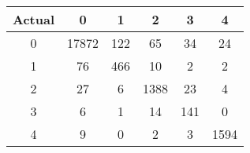 \begin{table}[ht]
\begin{minipage}{0.32\textwidth}
\begin{tabular}{cccccc}
            \cmidrule(lr){2-6}
            Actual & 0 & 1 & 2 & 3 & 4 \\
            \midrule
            0 & 17872 & 122 & 65  & 34  & 24  \\
            1 & 76    & 466 & 10  & 2   & 2   \\
            2 & 27    & 6   & 1388& 23  & 4   \\
            3 & 6     & 1   & 14  & 141 & 0   \\
            4 & 9     & 0   & 2   & 3   & 1594\\
            \bottomrule
        \end{tabular}
    \end{minipage}
\end{table}

\vspace{1em}

